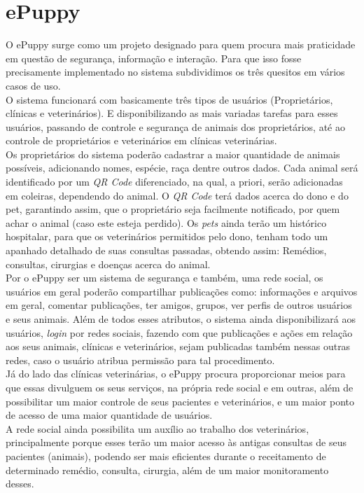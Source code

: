 \section{ePuppy}
O ePuppy surge como um projeto designado para quem procura mais praticidade em questão de segurança, informação e interação. Para que isso fosse precisamente implementado no sistema subdividimos os três quesitos em vários casos de uso.
\\
\indent
O sistema funcionará com basicamente três tipos de usuários (Proprietários, clínicas e veterinários). E disponibilizando as mais variadas tarefas para esses usuários, passando de controle e segurança de animais dos proprietários, até ao controle de proprietários e veterinários em clínicas veterinárias.
\\
\indent
Os proprietários do sistema poderão cadastrar a maior quantidade de animais possíveis, adicionando nomes, espécie, raça dentre outros dados. Cada animal será identificado por um {\it QR Code} diferenciado, na qual, a priori, serão adicionadas em coleiras, dependendo do animal. O {\it QR Code} terá dados acerca do dono e do pet, garantindo assim, que o proprietário seja facilmente notificado, por quem achar o animal (caso este esteja perdido). Os {\it pets} ainda terão um histórico hospitalar, para que os veterinários permitidos pelo dono, tenham todo um apanhado detalhado de suas consultas passadas, obtendo assim: Remédios, consultas, cirurgias e doenças acerca do animal.
\\
\indent
Por o ePuppy ser um sistema de segurança e também, uma rede social, os usuários em geral poderão compartilhar publicações como: informações e arquivos em geral, comentar publicações, ter amigos, grupos, ver perfis de outros usuários e seus animais. Além de todos esses atributos, o sistema ainda disponibilizará aos usuários, {\it login} por redes sociais, fazendo com que publicações e ações em relação aos seus animais, clínicas e veterinários, sejam publicadas também nessas outras redes, caso o usuário atribua permissão para tal procedimento.
\\
\indent
Já do lado das clínicas veterinárias, o ePuppy procura proporcionar meios para que essas divulguem os seus serviços, na própria rede social e em outras, além de possibilitar um maior controle de seus pacientes e veterinários, e um maior ponto de acesso de uma maior quantidade de usuários.
\\
\indent
A rede social ainda possibilita um auxílio ao trabalho dos veterinários, principalmente porque esses terão um maior acesso às antigas consultas de seus pacientes (animais), podendo ser mais eficientes durante o receitamento de determinado remédio, consulta, cirurgia, além de um maior monitoramento desses.


